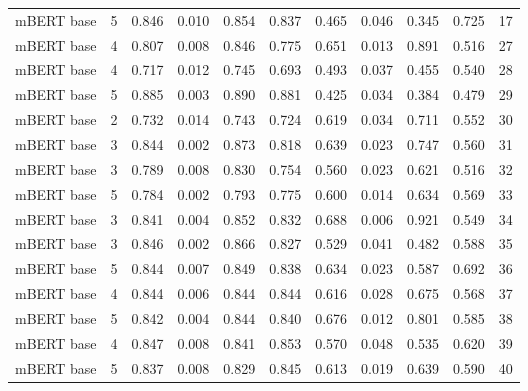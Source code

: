 \begin{tabular}{lrrrrrrrrrr}
        mBERT base &      5 &   0.846 &          0.010 &    0.854 &     0.837 &    0.465 &           0.046 &     0.345 &      0.725 &  17 \\
        mBERT base &      4 &   0.807 &          0.008 &    0.846 &     0.775 &    0.651 &           0.013 &     0.891 &      0.516 &  27 \\
        mBERT base &      4 &   0.717 &          0.012 &    0.745 &     0.693 &    0.493 &           0.037 &     0.455 &      0.540 &  28 \\
        mBERT base &      5 &   0.885 &          0.003 &    0.890 &     0.881 &    0.425 &           0.034 &     0.384 &      0.479 &  29 \\
        mBERT base &      2 &   0.732 &          0.014 &    0.743 &     0.724 &    0.619 &           0.034 &     0.711 &      0.552 &  30 \\
        mBERT base &      3 &   0.844 &          0.002 &    0.873 &     0.818 &    0.639 &           0.023 &     0.747 &      0.560 &  31 \\
        mBERT base &      3 &   0.789 &          0.008 &    0.830 &     0.754 &    0.560 &           0.023 &     0.621 &      0.516 &  32 \\
        mBERT base &      5 &   0.784 &          0.002 &    0.793 &     0.775 &    0.600 &           0.014 &     0.634 &      0.569 &  33 \\
        mBERT base &      3 &   0.841 &          0.004 &    0.852 &     0.832 &    0.688 &           0.006 &     0.921 &      0.549 &  34 \\
        mBERT base &      3 &   0.846 &          0.002 &    0.866 &     0.827 &    0.529 &           0.041 &     0.482 &      0.588 &  35 \\
        mBERT base &      5 &   0.844 &          0.007 &    0.849 &     0.838 &    0.634 &           0.023 &     0.587 &      0.692 &  36 \\
        mBERT base &      4 &   0.844 &          0.006 &    0.844 &     0.844 &    0.616 &           0.028 &     0.675 &      0.568 &  37 \\
        mBERT base &      5 &   0.842 &          0.004 &    0.844 &     0.840 &    0.676 &           0.012 &     0.801 &      0.585 &  38 \\
        mBERT base &      4 &   0.847 &          0.008 &    0.841 &     0.853 &    0.570 &           0.048 &     0.535 &      0.620 &  39 \\
        mBERT base &      5 &   0.837 &          0.008 &    0.829 &     0.845 &    0.613 &           0.019 &     0.639 &      0.590 &  40 \\
\bottomrule
\end{tabular}
